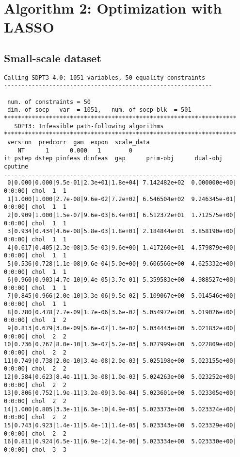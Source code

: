 \documentclass[11pt,a4paper]{report}
\begin{document}
\section{Algorithm 2: Optimization with LASSO}

\subsection{Small-scale dataset}
\begin{verbatim}
Calling SDPT3 4.0: 1051 variables, 50 equality constraints
------------------------------------------------------------

 num. of constraints = 50
 dim. of socp   var  = 1051,   num. of socp blk  = 501
*******************************************************************
   SDPT3: Infeasible path-following algorithms
*******************************************************************
 version  predcorr  gam  expon  scale_data
    NT      1      0.000   1        0    
it pstep dstep pinfeas dinfeas  gap      prim-obj      dual-obj    cputime
-------------------------------------------------------------------
 0|0.000|0.000|9.5e-01|2.3e+01|1.8e+04| 7.142482e+02  0.000000e+00| 0:0:00| chol  1  1 
 1|1.000|1.000|2.7e-08|9.6e-02|7.2e+02| 6.546504e+02  9.246345e-01| 0:0:00| chol  1  1 
 2|0.909|1.000|1.5e-07|9.6e-03|6.4e+01| 6.512372e+01  1.712575e+00| 0:0:00| chol  1  1 
 3|0.934|0.434|4.6e-08|5.8e-03|1.8e+01| 2.184844e+01  3.858190e+00| 0:0:00| chol  1  1 
 4|0.617|0.405|2.3e-08|3.5e-03|9.6e+00| 1.417260e+01  4.579879e+00| 0:0:00| chol  1  1 
 5|0.536|0.728|1.1e-08|9.6e-04|5.0e+00| 9.606566e+00  4.625332e+00| 0:0:00| chol  1  1 
 6|0.960|0.903|4.7e-10|9.4e-05|3.7e-01| 5.359583e+00  4.988527e+00| 0:0:00| chol  1  1 
 7|0.845|0.966|2.0e-10|3.3e-06|9.5e-02| 5.109067e+00  5.014546e+00| 0:0:00| chol  1  1 
 8|0.780|0.478|7.7e-09|1.7e-06|3.6e-02| 5.054972e+00  5.019026e+00| 0:0:00| chol  1  2 
 9|0.813|0.679|3.0e-09|5.6e-07|1.3e-02| 5.034443e+00  5.021832e+00| 0:0:00| chol  2  2 
10|0.736|0.767|8.0e-10|1.3e-07|5.2e-03| 5.027999e+00  5.022809e+00| 0:0:00| chol  2  2 
11|0.749|0.738|2.0e-10|3.4e-08|2.0e-03| 5.025198e+00  5.023155e+00| 0:0:00| chol  2  2 
12|0.584|0.623|8.4e-11|1.3e-08|1.0e-03| 5.024263e+00  5.023252e+00| 0:0:00| chol  2  2 
13|0.806|0.752|1.9e-11|3.2e-09|3.0e-04| 5.023601e+00  5.023305e+00| 0:0:00| chol  2  2 
14|1.000|0.805|3.3e-11|6.3e-10|4.9e-05| 5.023373e+00  5.023324e+00| 0:0:00| chol  2  2 
15|0.743|0.923|1.4e-11|5.4e-11|1.4e-05| 5.023343e+00  5.023329e+00| 0:0:00| chol  2  2 
16|0.811|0.924|6.5e-11|6.9e-12|4.3e-06| 5.023334e+00  5.023330e+00| 0:0:00| chol  3  3 

\end{verbatim}
\end{document}
